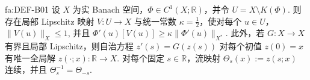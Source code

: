 \begin{FAProposition}{fa:DEF-B01}
设 \(\displaystyle X\) 为实 Banach 空间，\(\displaystyle\Phi\in C^1(X;\mathbb R)\)，并令 \(\displaystyle U=X\setminus K(\Phi)\). 则存在局部 Lipschitz 映射 \(\displaystyle V:U\to X\) 与统一常数 \(\displaystyle\kappa=\frac{1}{2}\)，使对每个 \(\displaystyle u\in U\)，
\(\displaystyle \|V(u)\|_X\leqslant1\),
并且
\(\displaystyle \Phi'(u)[V(u)] \geqslant \kappa\|\Phi'(u)\|_{X^*}\).
此外，若 \(\displaystyle G:X\to X\) 有界且局部 Lipschitz，则自治方程 \(\displaystyle z'(s)=G(z(s))\) 对每个初值 \(\displaystyle z(0)=x\) 有唯一全局解 \(\displaystyle z(\cdot;x):\mathbb R\to X\). 对每个固定 \(\displaystyle s\in\mathbb R\)，流映射 \(\displaystyle\Theta_s(x):=z(s;x)\) 连续，并且 \(\displaystyle\Theta_s^{-1}=\Theta_{-s}\).
\end{FAProposition}


